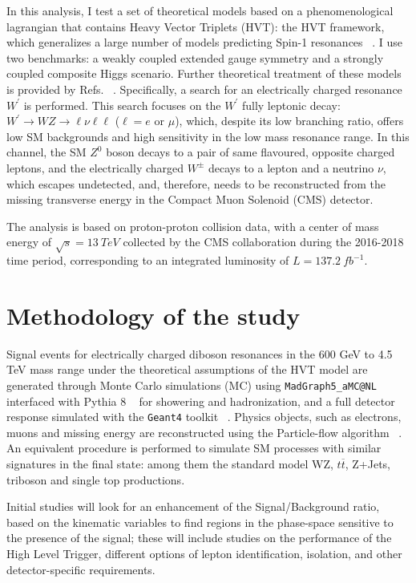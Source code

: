 \documentclass[10pt]{article}
\begin{document}
In this analysis, I test a set of theoretical models based on a phenomenological lagrangian that contains Heavy Vector Triplets (HVT): the HVT framework, which generalizes a large number of models predicting Spin-1 resonances ~\cite{hvt2014}. I use two benchmarks: a weakly coupled extended gauge symmetry and a strongly coupled composite Higgs scenario. Further theoretical treatment of these models is provided by Refs. ~\cite{hvt2014,modelA1980,modelB2011}. Specifically, a search for an electrically charged resonance $W^{\prime}$ is performed. This search focuses on the $W^{\prime}$ fully leptonic decay: $W^{\prime}\rightarrow WZ \rightarrow \ell\nu \ell\ell$ ($\ell = e$ or $\mu$), which, despite its low branching ratio, offers low SM backgrounds and high sensitivity in the low mass resonance range. In this channel, the SM $Z^{0}$ boson decays to a pair of same flavoured, opposite charged leptons, and the electrically charged $W^{\pm}$ decays to a lepton and a neutrino $\nu$, which escapes undetected, and, therefore, needs to be reconstructed from the missing transverse energy in the Compact Muon Solenoid (CMS) detector. 


The analysis is based on proton-proton collision data, with a center of mass energy of $\sqrt{s}=13~TeV$ collected by the CMS collaboration during the 2016-2018 time period, corresponding to an integrated luminosity of $L=137.2~fb^{-1}$. 


\section{Methodology of the study}

Signal events for electrically charged diboson resonances in the 600 GeV to 4.5 TeV mass range under the theoretical assumptions of the HVT model are generated through Monte Carlo simulations (MC) using \verb|MadGraph5_aMC@NL| ~\cite{madgraph} interfaced with Pythia 8 ~\cite{pythia} for showering and hadronization, and a full detector response simulated with the \verb|Geant4| toolkit ~\cite{geant4}. Physics objects, such as electrons, muons and missing energy are reconstructed using the Particle-flow algorithm ~\cite{particleflow}. An equivalent procedure is performed to simulate SM processes with similar signatures in the final state: among them the standard model WZ, $t\overline{t}$, Z+Jets, triboson and single top productions. 


Initial studies will look for an enhancement of the Signal/Background ratio, based on the kinematic variables to find regions in the phase-space sensitive to the presence of the signal; these will include studies on the performance of the High Level Trigger, different options of lepton identification, isolation, and other detector-specific requirements. 
\end{document}
